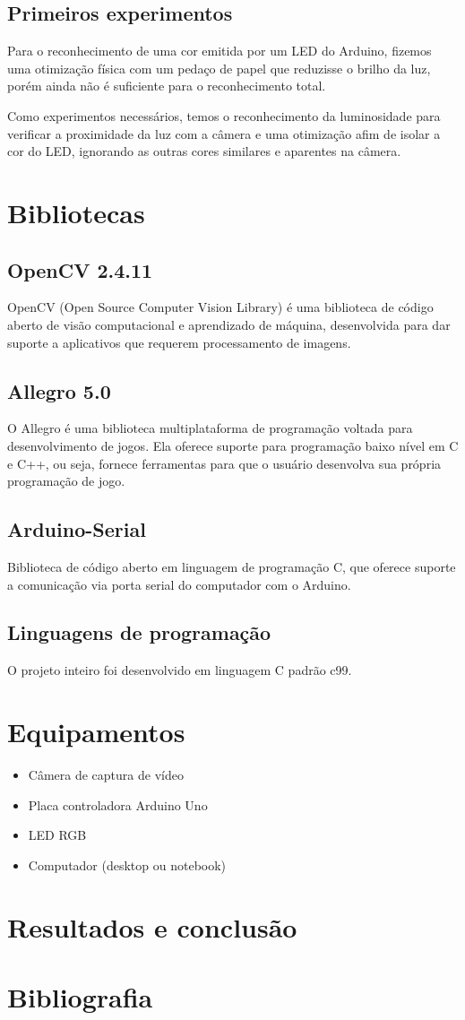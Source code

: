\documentclass[12pt]{article}
\begin{document}
\subsection{Primeiros experimentos}
Para o reconhecimento de uma cor emitida por um LED do Arduino, fizemos uma otimiza\c c\~ao f\'isica
com um peda\c co de papel que reduzisse o brilho da luz, por\'em ainda n\~ao \'e suficiente para
o reconhecimento total.

Como experimentos necess\'arios, temos o reconhecimento da luminosidade para verificar
a proximidade da luz com a c\^amera e uma otimiza\c c\~ao afim de isolar a cor do LED,
ignorando as outras cores similares e aparentes na c\^amera.

\section{Bibliotecas}
\subsection{OpenCV 2.4.11}
OpenCV (Open Source Computer Vision Library)
\'e uma biblioteca de c\'odigo aberto de vis\~ao computacional e aprendizado de m\'aquina,
desenvolvida para dar suporte a aplicativos que requerem processamento de imagens.
  
\subsection{Allegro 5.0}
O Allegro \'e uma biblioteca multiplataforma de programa\c c\~ao voltada para desenvolvimento de jogos. Ela
oferece suporte para programa\c c\~ao baixo n\'ivel em C e C++, ou seja, fornece ferramentas para que o usu\'ario
desenvolva sua pr\'opria programa\c c\~ao de jogo.
\subsection{Arduino-Serial}
Biblioteca de c\'odigo aberto em linguagem de programa\c c\~ao C, que oferece suporte a
comunica\c c\~ao via porta serial do computador com o Arduino.

\subsection{Linguagens de programa\c c\~ao}
O projeto inteiro foi desenvolvido em linguagem C padr\~ao c99.

\section{Equipamentos}
\begin{itemize}
\item C\^amera de captura de v\'ideo
\item Placa controladora Arduino Uno
\item LED RGB
\item Computador (desktop ou notebook)
\end{itemize}

\section{Resultados e conclusão}


\nocite{*}

\section{Bibliografia}


\end{document}
